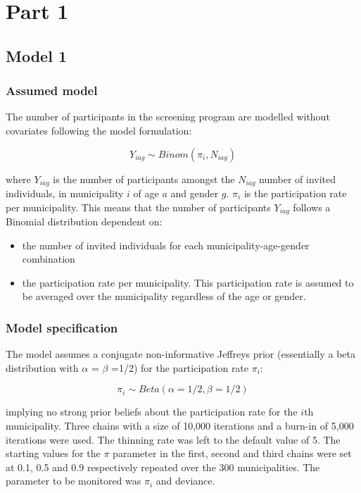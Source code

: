 \documentclass[12pt]{article}
\begin{document}
\section{Part 1}

\subsection{Model 1}

\subsubsection{Assumed model}
The number of participants in the screening program are modelled without covariates following the model formulation:

\[
    Y_{iag} \sim Binom(\pi_{i}, N_{iag})
\]

where $Y_{iag}$ is the number of participants amongst the $N_{iag}$ number of invited individuals, in municipality $i$ of age $a$ and gender $g$. $\pi_{i}$ is the participation rate per municipality. This means that the number of participants $Y_{iag}$ follows a Binomial distribution dependent on:

\begin{itemize}
    \item the number of invited individuals for each municipality-age-gender combination
    \item the participation rate per municipality. This participation rate is assumed to be averaged over the municipality regardless of the age or gender. 
\end{itemize}

\subsubsection{Model specification}

The model assumes a conjugate non-informative Jeffreys prior (essentially a beta distribution with $\alpha$ = $\beta$ =1/2) for the participation rate $\pi_i$:

\[
    \pi_{i} \sim Beta(\alpha=1/2, \beta=1/2)
\]

\noindent implying no strong prior beliefs about the participation rate for the $i$th municipality. Three chains with a size of 10,000 iterations and a burn-in of 5,000 iterations were used. The thinning rate was left to the default value of 5. The starting values for the $\pi$ parameter in the first, second and third chains were set at 0.1, 0.5 and 0.9 respectively repeated over the 300 municipalities. The parameter to be monitored was $\pi_i$ and deviance. 
\end{document}
